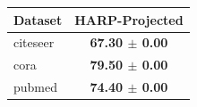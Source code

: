 \begin{tabular}{lc}
\toprule
Dataset & HARP-Projected \\
\midrule
citeseer & \textbf{67.30 $\pm$ 0.00} \\
cora & \textbf{79.50 $\pm$ 0.00} \\
pubmed & \textbf{74.40 $\pm$ 0.00} \\
\bottomrule
\end{tabular}
